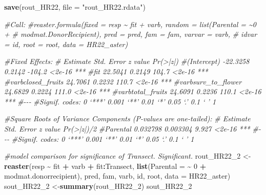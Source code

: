 \documentclass[
]{article}
\newenvironment{Shaded}{\begin{snugshade}}{\end{snugshade}}
\newcommand{\AttributeTok}[1]{\textcolor[rgb]{0.13,0.29,0.53}{#1}}
\newcommand{\CommentTok}[1]{\textcolor[rgb]{0.56,0.35,0.01}{\textit{#1}}}
\newcommand{\DecValTok}[1]{\textcolor[rgb]{0.00,0.00,0.81}{#1}}
\newcommand{\FunctionTok}[1]{\textcolor[rgb]{0.13,0.29,0.53}{\textbf{#1}}}
\newcommand{\NormalTok}[1]{#1}
\newcommand{\OtherTok}[1]{\textcolor[rgb]{0.56,0.35,0.01}{#1}}
\newcommand{\SpecialCharTok}[1]{\textcolor[rgb]{0.81,0.36,0.00}{\textbf{#1}}}
\newcommand{\StringTok}[1]{\textcolor[rgb]{0.31,0.60,0.02}{#1}}
\begin{document}
\begin{Shaded}
\begin{Highlighting}[]
\FunctionTok{save}\NormalTok{(rout\_HR22, }\AttributeTok{file =} \StringTok{"rout\_HR22.rdata"}\NormalTok{)}

\CommentTok{\#Call:}
\CommentTok{\#reaster.formula(fixed = resp \textasciitilde{} fit + varb, random = list(Parental = \textasciitilde{}0 + }
\CommentTok{\#    modmat.DonorRecipient), pred = pred, fam = fam, varvar = varb, }
\CommentTok{\#    idvar = id, root = root, data = HR22\_aster)}

\CommentTok{\#Fixed Effects:}
\CommentTok{\#                   Estimate Std. Error z value Pr(\textgreater{}|z|)    }
\CommentTok{\#(Intercept)        {-}22.3258     0.2142  {-}104.2   \textless{}2e{-}16 ***}
\CommentTok{\#fit                 22.5041     0.2149   104.7   \textless{}2e{-}16 ***}
\CommentTok{\#varbclosed\_fruits   24.7061     0.2232   110.7   \textless{}2e{-}16 ***}
\CommentTok{\#varbsurv\_to\_flower  24.6829     0.2224   111.0   \textless{}2e{-}16 ***}
\CommentTok{\#varbtotal\_fruits    24.6091     0.2236   110.1   \textless{}2e{-}16 ***}
\CommentTok{\#{-}{-}{-}}
\CommentTok{\#Signif. codes:  0 ‘***’ 0.001 ‘**’ 0.01 ‘*’ 0.05 ‘.’ 0.1 ‘ ’ 1}

\CommentTok{\#Square Roots of Variance Components (P{-}values are one{-}tailed):}
\CommentTok{\#         Estimate Std. Error z value Pr(\textgreater{}|z|)/2    }
\CommentTok{\#Parental 0.032798   0.003304   9.927     \textless{}2e{-}16 ***}
\CommentTok{\#{-}{-}{-}}
\CommentTok{\#Signif. codes:  0 ‘***’ 0.001 ‘**’ 0.01 ‘*’ 0.05 ‘.’ 0.1 ‘ ’ 1}

\CommentTok{\#model comparison for significance of Transect. Significant.}
\NormalTok{rout\_HR22\_2 }\OtherTok{\textless{}{-}} \FunctionTok{reaster}\NormalTok{(resp }\SpecialCharTok{\textasciitilde{}}\NormalTok{ fit }\SpecialCharTok{+}\NormalTok{ varb }\SpecialCharTok{+}\NormalTok{ fit}\SpecialCharTok{:}\NormalTok{Transect, }\FunctionTok{list}\NormalTok{(}\AttributeTok{Parental =} \SpecialCharTok{\textasciitilde{}} \DecValTok{0} \SpecialCharTok{+}\NormalTok{ modmat.donorrecipient),}
\NormalTok{    pred, fam, varb, id, root, }\AttributeTok{data =}\NormalTok{ HR22\_aster)}
\NormalTok{sout\_HR22\_2 }\OtherTok{\textless{}{-}}\FunctionTok{summary}\NormalTok{(rout\_HR22\_2)}
\NormalTok{sout\_HR22\_2}
\end{Highlighting}
\end{Shaded}
\end{document}
